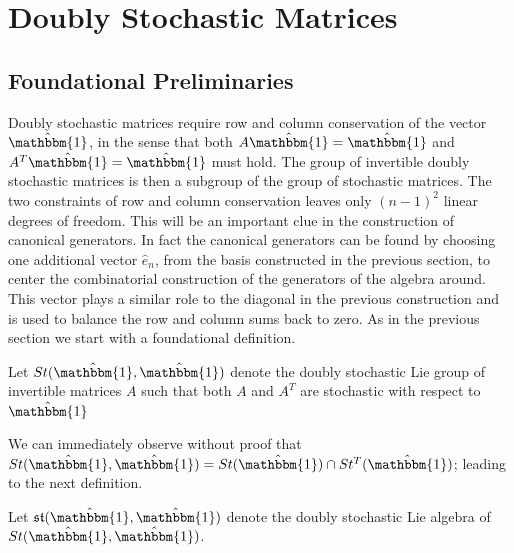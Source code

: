 \section{Doubly Stochastic Matrices}
\subsection{Foundational Preliminaries}

Doubly stochastic matrices require row and column conservation of the vector $\hat{\mathbbm{1}}$, 
in the sense that both $A \hat{\mathbbm{1}} = \hat{\mathbbm{1}}$ and $A^T \hat{\mathbbm{1}} = \hat{\mathbbm{1}}$ 
must hold. The group of invertible doubly stochastic matrices is then a subgroup
of the group of stochastic matrices. The two constraints of row and column 
conservation leaves only $\left(n - 1\right)^2$ linear degrees of freedom. This 
will be an important clue in the construction of canonical generators. In fact 
the canonical generators can be found by choosing one additional vector $\hat{e}_n$, 
from the basis constructed in the previous section, to center the combinatorial 
construction of the generators of the algebra around. This vector plays a 
similar role to the diagonal in the previous construction and is used to balance 
the row and column sums back to zero. As in the previous section we start with 
a foundational definition.

\begin{definition}
	Let $St(\hat{\mathbbm{1}}, \hat{\mathbbm{1}})$ denote the doubly stochastic 
	Lie group of invertible matrices $A$ such that both $A$ and $A^T$ are 
	stochastic with respect to $\hat{\mathbbm{1}}$
\end{definition}

We can immediately observe without proof that $St(\hat{\mathbbm{1}}, \hat{\mathbbm{1}}) = St(\hat{\mathbbm{1}}) \cap St^T(\hat{\mathbbm{1}})$;
leading to the next definition.

\begin{definition}
	Let $\mathfrak{st}(\hat{\mathbbm{1}}, \hat{\mathbbm{1}})$ denote the doubly 
	stochastic Lie algebra of $St(\hat{\mathbbm{1}},\hat{\mathbbm{1}})$.
\end{definition}

